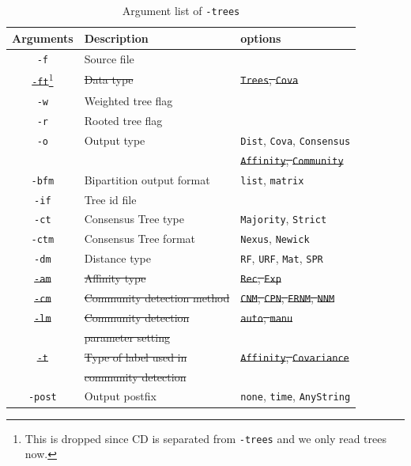 \documentclass[11pt,a4paper]{article}
\theoremstyle{definition}
\theoremstyle{definition}
\numberwithin{equation}{section}
\begin{document}
	\begin{table}[!h]
		\centering
		\begin{tabular}{cll}
			\hline
			Arguments & Description & options\\
			\hline
			\texttt{-f}& Source file &  \\
			\hline
			\st{\texttt{-ft}}\footnote{This is dropped since CD is separated from \texttt{-trees} and we only read trees now.}& \st{Data type} & \st{\texttt{Trees}, \texttt{Cova}}\\
			\hline
			\texttt{-w}& Weighted tree flag&\\
			\hline
			\texttt{-r}& Rooted tree flag& \\
			\hline
			\texttt{-o}& Output type & \texttt{Dist}, \texttt{Cova}, \texttt{Consensus}\\
			&&\st{\texttt{Affinity}, \texttt{Community}}\\
			\hline
			\texttt{-bfm}& Bipartition output format & \texttt{list}, \texttt{matrix}\\
			\hline
			\texttt{-if}& Tree id file&\\
			\hline
			\texttt{-ct}& Consensus Tree type& \texttt{Majority}, \texttt{Strict}\\
			\hline
			\texttt{-ctm}& Consensus Tree format& \texttt{Nexus}, \texttt{Newick}\\
			\hline
			\texttt{-dm}& Distance type& \texttt{RF}, \texttt{URF}, \texttt{Mat}, \texttt{SPR}\\
			\hline
			\st{\texttt{-am}}& \st{Affinity type}& \st{\texttt{Rec}, \texttt{Exp}}\\
			\hline
			\st{\texttt{-cm}}& \st{Community detection method}& \st{\texttt{CNM}, \texttt{CPN}, \texttt{ERNM}, \texttt{NNM}}\\
			\hline
			\st{\texttt{-lm}}& \st{Community detection} & \st{\texttt{auto}, \texttt{manu}}\\
			& \st{parameter setting}&\\
			\hline
			\st{\texttt{-t}}& \st{Type of label used in} & \st{\texttt{Affinity}, \texttt{Covariance}}\\
			& \st{community detection}&\\
			\hline
			\texttt{-post} & Output postfix&\texttt{none}, \texttt{time}, \texttt{AnyString}\\
			\hline
		\end{tabular}
		\caption{Argument list of \texttt{-trees}}
		\label{tab:treeslist}
	\end{table}
	
\end{document}
